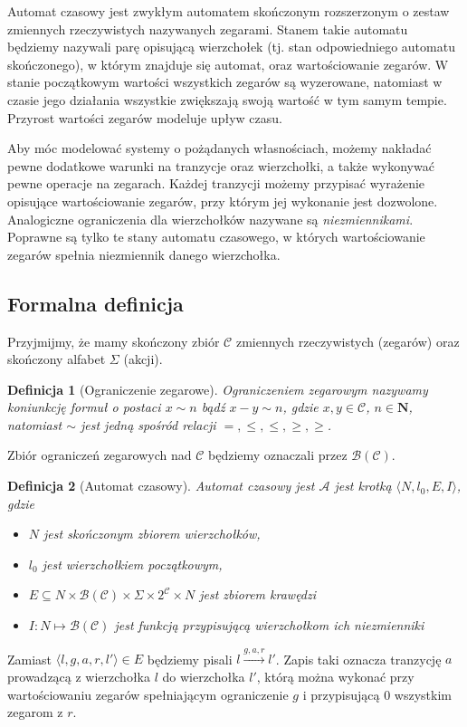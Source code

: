 \documentclass{pracamgr}
\theoremstyle{plain}
\newtheorem{definition}{Definicja}
\begin{document}
Automat czasowy jest zwykłym automatem skończonym rozszerzonym o
zestaw zmiennych rzeczywistych nazywanych zegarami.  Stanem takie
automatu będziemy nazywali parę opisującą wierzchołek (tj. stan
odpowiedniego automatu skończonego), w którym znajduje się automat,
oraz wartościowanie zegarów. W stanie początkowym wartości wszystkich
zegarów są wyzerowane, natomiast w czasie jego działania wszystkie
zwiększają swoją wartość w tym samym tempie. Przyrost wartości zegarów
modeluje upływ czasu.

Aby móc modelować systemy o pożądanych własnościach, możemy nakładać
pewne dodatkowe warunki na tranzycje oraz wierzchołki, a także
wykonywać pewne operacje na zegarach. Każdej tranzycji możemy
przypisać wyrażenie opisujące wartościowanie zegarów, przy którym jej
wykonanie jest dozwolone. Analogiczne ograniczenia dla wierzchołków
nazywane są \emph{niezmiennikami}. Poprawne są tylko te stany automatu
czasowego, w których wartościowanie zegarów spełnia niezmiennik danego
wierzchołka.


\subsection{Formalna definicja} Przyjmijmy, że mamy skończony zbiór
$\mathcal{C}$ zmiennych rzeczywistych (zegarów) oraz skończony alfabet
$\Sigma$ (akcji).

\begin{definition}[Ograniczenie zegarowe] Ograniczeniem zegarowym
nazywamy koniunkcję formuł o postaci $x \sim n$ bądź $x - y \sim n$,
gdzie $x, y \in \mathcal{C}$, $n \in \mathbf{N}$, natomiast $\sim$
jest jedną spośród relacji $=, \le, \leq, \ge, \geq$.
\end{definition}
Zbiór ograniczeń zegarowych nad $\mathcal{C}$ będziemy oznaczali przez
$\mathcal{B}(\mathcal{C})$.

\begin{definition}[Automat czasowy] Automat czasowy jest $\mathcal{A}$
jest krotką $\langle N, l_0, E, I\rangle$, gdzie
  \begin{itemize}
    \item $N$ jest skończonym zbiorem wierzchołków,
    \item $l_0$ jest wierzchołkiem początkowym,
    \item $E \subseteq N \times \mathcal{B}(\mathcal{C}) \times \Sigma
    \times 2^{\mathcal{C}} \times N$ jest zbiorem krawędzi
    \item $I: N \mapsto \mathcal{B}(\mathcal{C})$ jest funkcją
    przypisującą wierzchołkom ich niezmienniki
  \end{itemize}
\end{definition}
Zamiast $\langle l, g, a, r, l' \rangle \in E$ będziemy pisali $l
\stackrel{g, a, r}{\longrightarrow} l'$. Zapis taki oznacza tranzycję
$a$ prowadzącą z wierzchołka $l$ do wierzchołka $l'$, którą można
wykonać przy wartościowaniu zegarów spełniającym ograniczenie $g$ i
przypisującą $0$ wszystkim zegarom z $r$.
\end{document}
